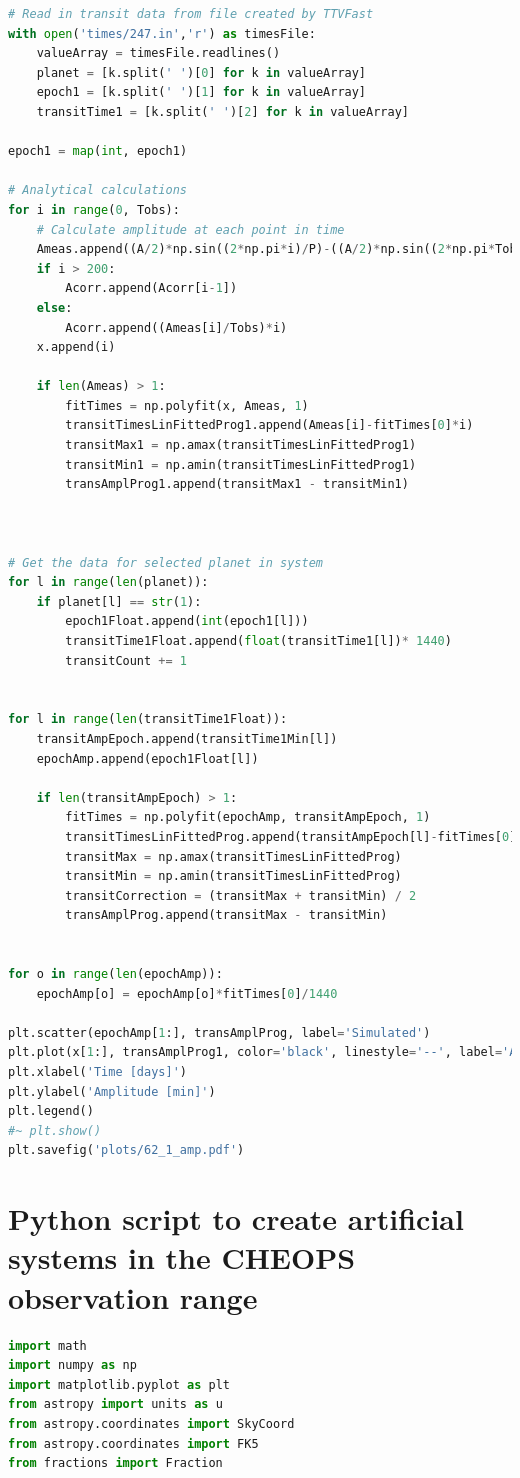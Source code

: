 \documentclass[12pt]{report}
\begin{document}
\begin{appendix}
\begin{lstlisting}[language=python]
# Read in transit data from file created by TTVFast
with open('times/247.in','r') as timesFile:
	valueArray = timesFile.readlines()
	planet = [k.split(' ')[0] for k in valueArray]
	epoch1 = [k.split(' ')[1] for k in valueArray]
	transitTime1 = [k.split(' ')[2] for k in valueArray]
	
epoch1 = map(int, epoch1)

# Analytical calculations
for i in range(0, Tobs):
	# Calculate amplitude at each point in time
	Ameas.append((A/2)*np.sin((2*np.pi*i)/P)-((A/2)*np.sin((2*np.pi*Tobs)/P))*(i/Tobs))
	if i > 200:
		Acorr.append(Acorr[i-1])
	else:
		Acorr.append((Ameas[i]/Tobs)*i)
	x.append(i)

	if len(Ameas) > 1:
		fitTimes = np.polyfit(x, Ameas, 1)
		transitTimesLinFittedProg1.append(Ameas[i]-fitTimes[0]*i)
		transitMax1 = np.amax(transitTimesLinFittedProg1)
		transitMin1 = np.amin(transitTimesLinFittedProg1)
		transAmplProg1.append(transitMax1 - transitMin1)
	
	
	
# Get the data for selected planet in system
for l in range(len(planet)):
	if planet[l] == str(1):
		epoch1Float.append(int(epoch1[l]))
		transitTime1Float.append(float(transitTime1[l])* 1440)
		transitCount += 1


for l in range(len(transitTime1Float)):
	transitAmpEpoch.append(transitTime1Min[l])
	epochAmp.append(epoch1Float[l])

	if len(transitAmpEpoch) > 1:
		fitTimes = np.polyfit(epochAmp, transitAmpEpoch, 1)
		transitTimesLinFittedProg.append(transitAmpEpoch[l]-fitTimes[0]*epoch1Float[l])
		transitMax = np.amax(transitTimesLinFittedProg)
		transitMin = np.amin(transitTimesLinFittedProg)
		transitCorrection = (transitMax + transitMin) / 2	
		transAmplProg.append(transitMax - transitMin)
		
		
for o in range(len(epochAmp)):
	epochAmp[o] = epochAmp[o]*fitTimes[0]/1440

plt.scatter(epochAmp[1:], transAmplProg, label='Simulated')
plt.plot(x[1:], transAmplProg1, color='black', linestyle='--', label='Analytical')
plt.xlabel('Time [days]')
plt.ylabel('Amplitude [min]')
plt.legend()
#~ plt.show()
plt.savefig('plots/62_1_amp.pdf')

\end{lstlisting}
\chapter{Python script to create artificial systems in the CHEOPS observation range}
\begin{lstlisting}[language=python]
import math
import numpy as np
import matplotlib.pyplot as plt
from astropy import units as u
from astropy.coordinates import SkyCoord
from astropy.coordinates import FK5
from fractions import Fraction  


\end{lstlisting}
\end{appendix}
\end{document}
